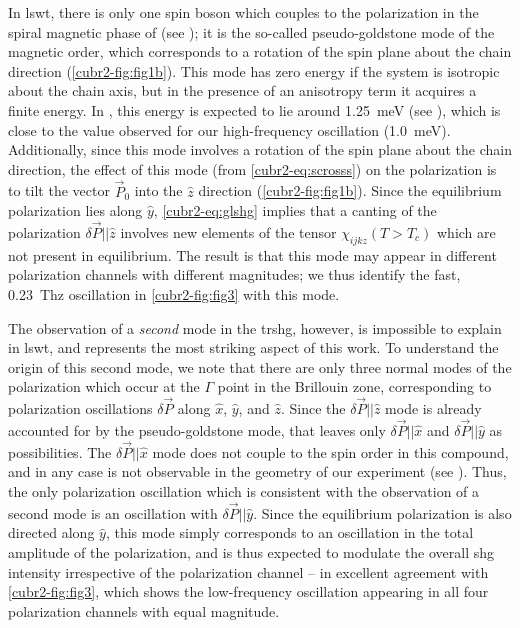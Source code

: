 In \gls{lswt}, there is only one spin boson which couples to the polarization in the spiral magnetic phase of  (see ); it is the so-called pseudo-goldstone mode of the magnetic order\cite{katsura_dynamical_2007}, which corresponds to a rotation of the spin plane about the chain direction (\cref{cubr2-fig:fig1b}).
This mode has zero energy if the system is isotropic about the chain axis, but in the presence of an anisotropy term it acquires a finite energy.
In , this energy is expected to lie around \qty{1.25}{meV} (see ), which is close to the value observed for our high-frequency oscillation (\qty{1.0}{meV}).
Additionally, since this mode involves a rotation of the spin plane about the chain direction, the effect of this mode (from \cref{cubr2-eq:scrosss}) on the polarization is to tilt the vector $\vec{P}_0$ into the $\hat{z}$ direction (\cref{cubr2-fig:fig1b}).
Since the equilibrium polarization lies along $\hat{y}$, \cref{cubr2-eq:glshg} implies that a canting of the polarization $\delta \vec{P} || \hat{z}$ involves new elements of the tensor $\chi_{ijkz}(T>T_c)$ which are not present in equilibrium.
The result is that this mode may appear in different polarization channels with different magnitudes; we thus identify the fast, \qty{0.23}{Thz} oscillation in \cref{cubr2-fig:fig3} with this mode.

The observation of a \emph{second} mode in the \gls{trshg}, however, is impossible to explain in \gls{lswt}, and represents the most striking aspect of this work.
To understand the origin of this second mode, we note that there are only three normal modes of the polarization which occur at the $\Gamma$ point in the Brillouin zone, corresponding to polarization oscillations $\delta\vec{P}$ along $\hat{x}$, $\hat{y}$, and $\hat{z}$.
Since the $\delta\vec{P} || \hat{z}$ mode is already accounted for by the pseudo-goldstone mode, that leaves only $\delta\vec{P} || \hat{x}$ and $\delta\vec{P} || \hat{y}$ as possibilities.
The $\delta\vec{P} || \hat{x}$ mode does not couple to the spin order in this compound\cite{katsura_dynamical_2007}, and in any case is not observable in the geometry of our experiment (see ).
Thus, the only polarization oscillation which is consistent with the observation of a second mode is an oscillation with $\delta\vec{P} || \hat{y}$.
Since the equilibrium polarization is also directed along $\hat{y}$, this mode simply corresponds to an oscillation in the total amplitude of the polarization, and is thus expected to modulate the overall \gls{shg} intensity irrespective of the polarization channel -- in excellent agreement with \cref{cubr2-fig:fig3}, which shows the low-frequency oscillation appearing in all four polarization channels with equal magnitude.

